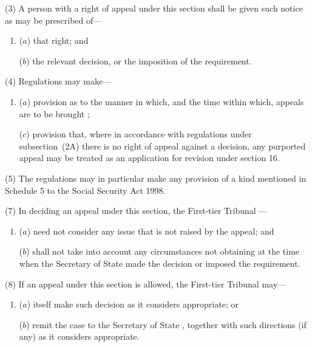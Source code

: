 \documentclass[12pt,a4paper]{article}
\begin{document}
(3) A person with a right of appeal under this section shall be given such notice as may be prescribed of—
\begin{enumerate}\item[]
($a$) that right; and

($b$) the relevant decision, or the imposition of the requirement.
\end{enumerate}

(4) Regulations may make—
\begin{enumerate}\item[]
($a$) provision as to the manner in which, and the time within which, appeals are to be brought%
;

($c$) provision that, where in accordance with regulations under subsection~(2A) there is no right of appeal against a decision, any purported appeal may be treated as an application for revision under section 16.
\end{enumerate}

(5) The regulations may in particular make any provision of a kind mentioned in Schedule 5 to the Social Security Act 1998. 


(7) In deciding an appeal under this section, 
the First-tier Tribunal%
—
\begin{enumerate}\item[]
($a$) need not consider any issue that is not raised by the appeal; and

($b$) shall not take into account any circumstances not obtaining at the time when the 
Secretary of State  %
made the decision or imposed the requirement.
\end{enumerate}

(8) If an appeal under this section is allowed, the 
First-tier Tribunal  %
may—
\begin{enumerate}\item[]
($a$) itself make such decision as it considers appropriate; or

($b$) remit the case to the 
Secretary of State%
, together with such directions (if any) as it considers appropriate.
\end{enumerate}
\end{document}
